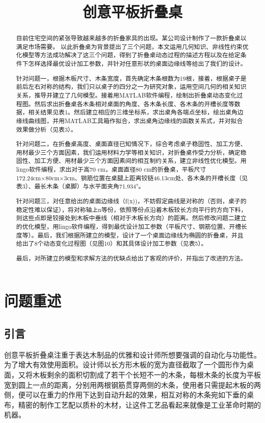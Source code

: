 \documentclass[bwprint]{cumcmthesis}
\title{创意平板折叠桌}
\begin{document}
 \maketitle
 \begin{abstract}
 目前住宅空间的紧张导致越来越多的折叠家具的出现。某公司设计制作了一款折叠桌以满足市场需要。
 以此折叠桌为背景提出了三个问题，本文运用几何知识、非线性约束优化模型等方法成功解决了这三个问题，得到了折叠桌动态过程的描述方程以及在给定条件下怎样选择最优设计加工参数，并针对任意形状的桌面边缘线等给出了我们的设计。

针对问题一，根据木板尺寸、木条宽度，首先确定木条根数为19根，接着，根据桌子是前后左右对称的结构，我们只以桌子的四分之一为研究对象，运用空间几何的相关知识关系，推导并建立了几何模型。接着用MATLAB软件编程，绘制出折叠桌动态变化过程图。然后求出折叠桌各木条相对桌面的角度、各木条长度、各木条的开槽长度等数据，相关结果见表1。然后建立相应的三维坐标系，求出桌角各端点坐标，绘出桌角边缘线曲线图，并用MATLAB工具箱作拟合，求出桌角边缘线的函数关系式，并对拟合效果做分析（见表3）。

针对问题二，在折叠桌高度、桌面直径已知情况下，综合考虑桌子稳固性、加工方便、用材最少三个方面因素，我们运用材料力学等相关知识，对折叠桌作受力分析，确定稳固性、加工方便、用材最少三个方面因素间的相互制约关系，建立非线性优化模型。用lingo软件编程，求出对于高70 cm，桌面直径80 cm的折叠桌，平板尺寸172.24cm×80cm×3cm、钢筋位置在桌腿上距离铰链46.13cm处、各木条的开槽长度（见表3）、最长木条（桌脚）与水平面夹角71.934°。

针对问题三，对任意给出的桌面边缘线（f(x))，不妨假定曲线是对称的（否则，桌子的稳定性难以保证），将对称轴上n等份，依照等份点沿着木板较长方向平行的方向下料，则这些点即是铰接处到木板中垂线（相对于木板长方向）的距离。然后修改问题二建立的优化模型，用lingo软件编程，得到最优设计加工参数（平板尺寸、钢筋位置、开槽长度等）。最后，我们根据所建立的模型，设计了一个桌面边缘线为椭圆的折叠桌，并且给出了8个动态变化过程图（见图10）和其具体设计加工参数（见表5）。

最后，对所建立的模型和求解方法的优缺点给出了客观的评价，并指出了改进的方法。

\end{abstract}

\section{问题重述}
\subsection{引言}
创意平板折叠桌注重于表达木制品的优雅和设计师所想要强调的自动化与功能性。为了增大有效使用面积。设计师以长方形木板的宽为直径截取了一个圆形作为桌面，又将木板剩余的面积切割成了若干个长短不一的木条，每根木条的长度为平板宽到圆上一点的距离，分别用两根钢筋贯穿两侧的木条，使用者只需提起木板的两侧，便可以在重力的作用下达到自动升起的效果，相互对称的木条宛如下垂的桌布，精密的制作工艺配以质朴的木材，让这件工艺品看起来就像是工业革命时期的机器。
\end{document}
